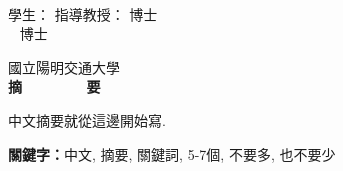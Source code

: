 
  \begin{center}
	\large
    \begin{singlespace}    
      \textbf{\chineseTitle{}} \\[0.5cm]
    \end{singlespace}
    
    \begin{singlespace}    

    學生：\studentCnName  \hspace{2.5cm}  指導教授：\advisorCnName \hspace{0.1cm} 博士 \\
    \ifdefined\advisorCnNameB %
    \hspace{9.6cm}  \advisorCnNameB ~ 博士 \\
    \fi
    \end{singlespace}

    \vspace{0.5cm}

    國立陽明交通大學\ \DepartInstitCnName\ \iftoggle{iamphd}{博士班}{碩士班} \\[0.5cm]
    \textbf{摘~~~~~~~~要} \\[0.5cm]

  \end{center}
  \normalsize 
  中文摘要就從這邊開始寫.

  \vspace{1cm}

  \textbf{關鍵字：}中文, 摘要, 關鍵詞, 5-7個, 不要多, 也不要少
